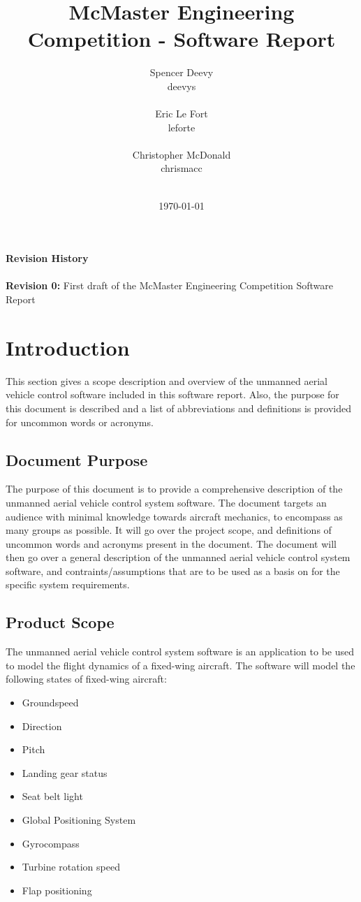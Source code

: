 \documentclass[titlepage]{article}
\title{McMaster Engineering Competition - Software Report}
\author
{
	Spencer Deevy\\
	deevys\\\\
	Eric Le Fort\\
	leforte\\\\
	Christopher McDonald\\
	chrismacc\\\\
}
\date{\today}
\begin{document}
\maketitle
\newpage
\tableofcontents
\vfill \noindent
{\large \bf Revision History}\\\\
\textbf{Revision 0:} First draft of the McMaster Engineering Competition Software Report
\newpage

\section{Introduction}
This section gives a scope description and overview of the unmanned aerial vehicle control software included in this software report. Also,
the purpose for this document is described and a list of abbreviations and definitions is provided for uncommon words or acronyms.
 
\subsection{Document Purpose}
The purpose of this document is to provide a comprehensive description of the unmanned aerial vehicle control system software. The document targets an audience with minimal knowledge towards aircraft mechanics, to encompass as many groups as possible. It will go over the project scope, and definitions of uncommon words and acronyms present in the document. The document will then go over a general description of the unmanned aerial vehicle control system software, and contraints/assumptions that are to be used as a basis on for the specific system requirements.

\subsection{Product Scope}
The unmanned aerial vehicle control system software is an application to be used to model the flight dynamics of a fixed-wing aircraft. The software will model the following states of fixed-wing aircraft:

\begin{itemize}
\item Groundspeed
\item Direction
\item Pitch
\item Landing gear status
\item Seat belt light
\item Global Positioning System
\item Gyrocompass
\item Turbine rotation speed
\item Flap positioning
\end{itemize}
\end{document}
